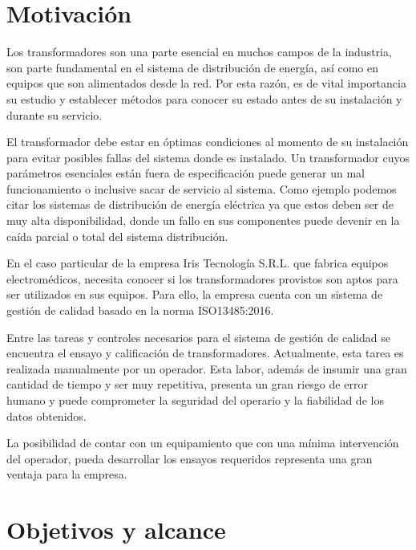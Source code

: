 
\section{Motivación}
Los transformadores son una parte esencial en muchos campos de la industria, son parte fundamental en el sistema de distribución de energía, así como en equipos que son alimentados desde la red. Por esta razón, es de vital importancia su estudio y establecer métodos para conocer su estado antes de su instalación y durante su servicio.

El transformador debe estar en óptimas condiciones al momento de su instalación para evitar posibles fallas del sistema donde es instalado. Un transformador cuyos parámetros esenciales están fuera de especificación puede generar un mal funcionamiento o inclusive sacar de servicio al sistema. Como ejemplo podemos citar los sistemas de distribución de energía eléctrica ya que estos deben ser de muy alta disponibilidad, donde un fallo en sus componentes puede devenir en la caída parcial o total del sistema distribución.

En el caso particular de la empresa Iris Tecnología S.R.L. que fabrica equipos electromédicos, necesita conocer si los transformadores provistos son aptos para ser utilizados en sus equipos. Para ello, la empresa cuenta con un sistema de gestión de calidad basado en la norma ISO13485:2016.

Entre las tareas y controles necesarios para el sistema de gestión de calidad se encuentra el ensayo y calificación de transformadores. Actualmente, esta tarea es realizada manualmente por un operador. Esta labor, además de insumir una gran cantidad de tiempo y ser muy repetitiva, presenta un gran riesgo de error humano y puede comprometer la seguridad del operario y la fiabilidad de los datos obtenidos.

La posibilidad de contar con un equipamiento que con una mínima intervención del operador, pueda desarrollar los ensayos requeridos representa una gran ventaja para la empresa.


\section{Objetivos y alcance}

